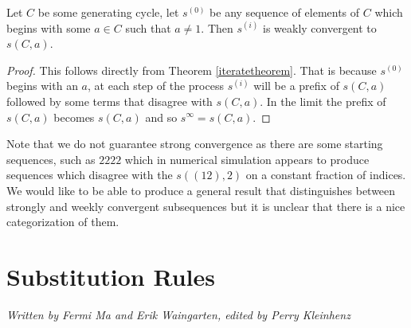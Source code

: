 \documentclass[runningheads,a4paper]{llncs}
\newtheorem{conj}[theorem]{Conjecture}
\begin{document}
\begin{corollary}
Let $C$ be some generating cycle, let $s^{(0)}$ be any sequence of elements of $C$ which begins with some $a \in C$ such that $a \neq 1$. Then $s^{(i)}$ is weakly convergent to $s(C,a)$. 
\end{corollary}
\begin{proof} 
This follows directly from Theorem \ref{iteratetheorem}. That is because $s^{(0)}$ begins with an $a$, at each step of the process $s^{(i)}$ will be a prefix of $s(C,a)$ followed by some terms that disagree with $s(C,a)$. In the limit the prefix of $s(C,a)$ becomes $s(C,a)$ and so $s^{\infty} = s(C,a)$.
\end{proof}
Note that we do not guarantee strong convergence as there are some starting sequences, such as $2222$ which in numerical simulation appears to produce sequences which disagree with the $s( (12), 2)$ on a constant fraction of indices. We would like to be able to produce a general result that distinguishes between strongly and weekly convergent subsequences but it is unclear that there is a nice categorization of them. 

%

\section{Substitution Rules}
\label{substitutionrules}

\emph{Written by Fermi Ma and Erik Waingarten, edited by Perry Kleinhenz}
\end{document}
